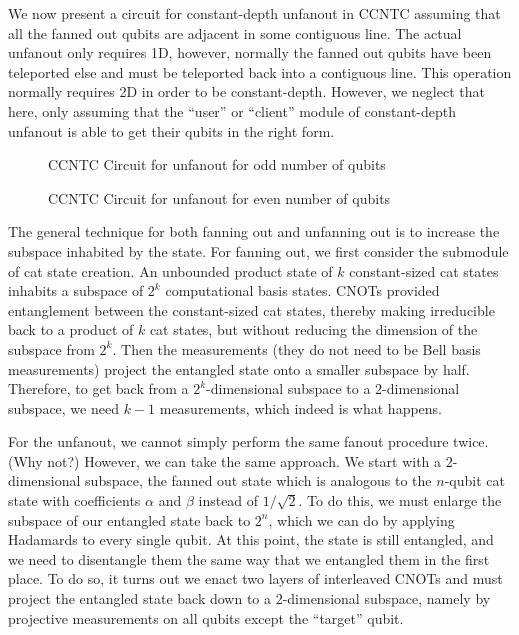 \documentclass{article}
\begin{document}
We now present a circuit for constant-depth unfanout in CCNTC
assuming that all the fanned out qubits are adjacent in some
contiguous line. The actual unfanout only requires 1D,
however, normally the fanned out qubits have been teleported else
and must be teleported back into a contiguous line. This operation
normally requires 2D in order to be constant-depth. However, we
neglect that here, only assuming that the ``user'' or ``client''
module of constant-depth unfanout is able to get their qubits
in the right form.


\begin{figure}
\caption{CCNTC Circuit for unfanout for odd number of qubits}
\end{figure}

\begin{figure}
\caption{CCNTC Circuit for unfanout for even number of qubits}
\end{figure}

The general technique for both fanning out and unfanning out is to
increase the subspace inhabited by the state. For fanning out,
we first consider the submodule of cat state creation. An
unbounded product state of $k$ constant-sized cat states inhabits
a subspace of $2^k$ computational basis states. CNOTs provided
entanglement between the constant-sized cat states, thereby 
making irreducible back to a product of $k$ cat states, but
without reducing the dimension of the subspace from $2^k$.
Then the measurements (they do not need to be Bell basis measurements)
project the entangled state onto a smaller subspace by half.
Therefore, to get back from a $2^k$-dimensional subspace to a
$2$-dimensional subspace, we need $k-1$ measurements, which indeed
is what happens.

For the unfanout, we cannot simply perform the same fanout procedure
twice.  (Why not?) However, we can take the same approach.
We start with a $2$-dimensional subspace, the fanned out state
which is analogous to the $n$-qubit cat state with coefficients
$\alpha$ and $\beta$ instead of $1/\sqrt{2}$. To do this, we
must enlarge the subspace of our entangled state back to $2^n$,
which we can do by applying Hadamards to every single qubit. At this
point, the state is still entangled, and we need to disentangle them
the same way that we entangled them in the first place.
To do so, it turns out 
we enact two layers of interleaved CNOTs and must project the entangled
state back down to a $2$-dimensional subspace, namely by projective
measurements on all qubits except the ``target'' qubit.
\end{document}
